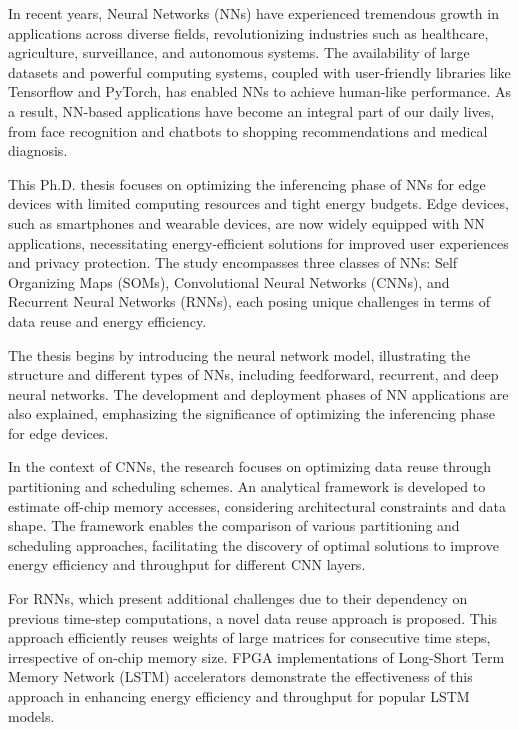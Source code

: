 \begin{comment}
In conclusion, this thesis contributes to the optimization of NN accelerators on parallel architectures, addressing energy efficiency and throughput challenges. The analytical framework and data-reuse schemes provide valuable insights for designing energy-efficient NN inferencing on edge devices.
\end{comment}
In recent years, Neural Networks (NNs) have experienced tremendous growth in applications across diverse fields, revolutionizing industries such as healthcare, agriculture, surveillance, and autonomous systems. The availability of large datasets and powerful computing systems, coupled with user-friendly libraries like Tensorflow and PyTorch, has enabled NNs to achieve human-like performance. As a result, NN-based applications have become an integral part of our daily lives, from face recognition and chatbots to shopping recommendations and medical diagnosis.

This Ph.D. thesis focuses on optimizing the inferencing phase of NNs for edge devices with limited computing resources and tight energy budgets. Edge devices, such as smartphones and wearable devices, are now widely equipped with NN applications, necessitating energy-efficient solutions for improved user experiences and privacy protection. The study encompasses three classes of NNs: Self Organizing Maps (SOMs), Convolutional Neural Networks (CNNs), and Recurrent Neural Networks (RNNs), each posing unique challenges in terms of data reuse and energy efficiency.

The thesis begins by introducing the neural network model, illustrating the structure and different types of NNs, including feedforward, recurrent, and deep neural networks. The development and deployment phases of NN applications are also explained, emphasizing the significance of optimizing the inferencing phase for edge devices.

In the context of CNNs, the research focuses on optimizing data reuse through partitioning and scheduling schemes. An analytical framework is developed to estimate off-chip memory accesses, considering architectural constraints and data shape. The framework enables the comparison of various partitioning and scheduling approaches, facilitating the discovery of optimal solutions to improve energy efficiency and throughput for different CNN layers.

For RNNs, which present additional challenges due to their dependency on previous time-step computations, a novel data reuse approach is proposed. This approach efficiently reuses weights of large matrices for consecutive time steps, irrespective of on-chip memory size. FPGA implementations of Long-Short Term Memory Network (LSTM) accelerators demonstrate the effectiveness of this approach in enhancing energy efficiency and throughput for popular LSTM models.

